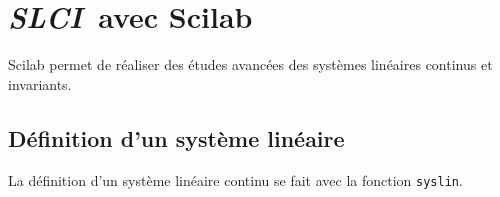 \newpage
\section{\emph{{\scshape SLCI}}~avec Scilab}

Scilab permet de réaliser des études avancées des systèmes linéaires continus 
et invariants.

\subsection{Définition d'un système linéaire}
La définition d'un système linéaire continu se fait avec la fonction 
\verb?syslin?. 

